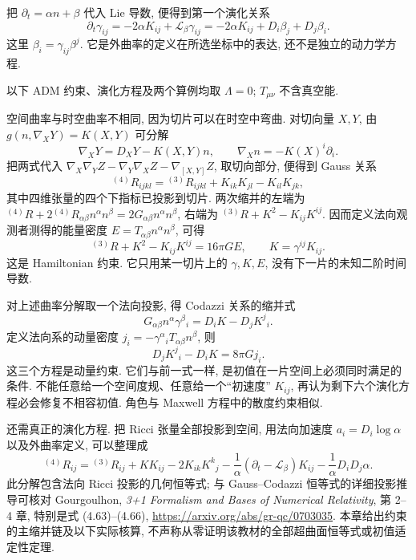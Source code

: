把 $\partial_t=\alpha n+\beta$ 代入 Lie 导数, 便得到第一个演化关系
\begin{equation}
 \partial_t\gamma_{ij}=-2\alpha K_{ij}+\mathcal L_\beta\gamma_{ij}
    =-2\alpha K_{ij}+D_i\beta_j+D_j\beta_i.
 \label{eq:gr-adm-gamma-evolution}
\end{equation}
这里 $\beta_i=\gamma_{ij}\beta^j$. 它是外曲率的定义在所选坐标中的表达, 还不是独立的动力学方程.


以下 ADM 约束、演化方程及两个算例均取 $\Lambda=0$; $T_{\mu\nu}$ 不含真空能.

空间曲率与时空曲率不相同, 因为切片可以在时空中弯曲. 对切向量 $X,Y$, 由 $g(n,\nabla_XY)=K(X,Y)$ 可分解
\[
 \nabla_XY=D_XY-K(X,Y)n,\qquad \nabla_Xn=-K(X)^i\partial_i.
\]
把两式代入 $\nabla_X\nabla_YZ-\nabla_Y\nabla_XZ-\nabla_{[X,Y]}Z$, 取切向部分, 便得到 Gauss 关系
\begin{equation}
 {}^{(4)}R_{ijkl}={}^{(3)}R_{ijkl}+K_{ik}K_{jl}-K_{il}K_{jk},
 \label{eq:gr-adm-gauss}
\end{equation}
其中四维张量的四个下指标已投影到切片. 两次缩并的左端为 ${}^{(4)}R+2{}^{(4)}R_{\alpha\beta}n^\alpha n^\beta=2G_{\alpha\beta}n^\alpha n^\beta$, 右端为 ${}^{(3)}R+K^2-K_{ij}K^{ij}$. 因而定义法向观测者测得的能量密度 $E=T_{\alpha\beta}n^\alpha n^\beta$, 可得
\begin{equation}
 {}^{(3)}R+K^2-K_{ij}K^{ij}=16\pi G E,
 \qquad K=\gamma^{ij}K_{ij}.
 \label{eq:gr-hamiltonian-constraint}
\end{equation}
这是 Hamiltonian 约束. 它只用某一切片上的 $\gamma,K,E$, 没有下一片的未知二阶时间导数.

对上述曲率分解取一个法向投影, 得 Codazzi 关系的缩并式
\[
 G_{\alpha\beta}n^\alpha\gamma^\beta{}_i
    =D_iK-D_jK^j{}_i.
\]
定义法向系的动量密度 $j_i=-\gamma^\alpha{}_iT_{\alpha\beta}n^\beta$, 则
\begin{equation}
 D_jK^j{}_i-D_iK=8\pi G j_i.
 \label{eq:gr-momentum-constraint}
\end{equation}
这三个方程是动量约束. 它们与前一式一样, 是初值在一片空间上必须同时满足的条件. 不能任意给一个空间度规、任意给一个“初速度” $K_{ij}$, 再认为剩下六个演化方程必会修复不相容初值. 角色与 Maxwell 方程中的散度约束相似.

还需真正的演化方程. 把 Ricci 张量全部投影到空间, 用法向加速度 $a_i=D_i\log\alpha$ 以及外曲率定义, 可以整理成
\begin{equation}
 {}^{(4)}R_{ij}={}^{(3)}R_{ij}+KK_{ij}-2K_{ik}K^k{}_j
       -\frac1\alpha(\partial_t-\mathcal L_\beta)K_{ij}
       -\frac1\alpha D_iD_j\alpha.
 \label{eq:gr-adm-ricci-space}
\end{equation}
此分解包含法向 Ricci 投影的几何恒等式; 与 Gauss--Codazzi 恒等式的详细投影推导可核对 Gourgoulhon, \emph{3+1 Formalism and Bases of Numerical Relativity}, 第 2--4 章, 特别是式 (4.63)--(4.66), \url{https://arxiv.org/abs/gr-qc/0703035}. 本章给出约束的主缩并链及以下实际核算, 不声称从零证明该教材的全部超曲面恒等式或初值适定性定理.

